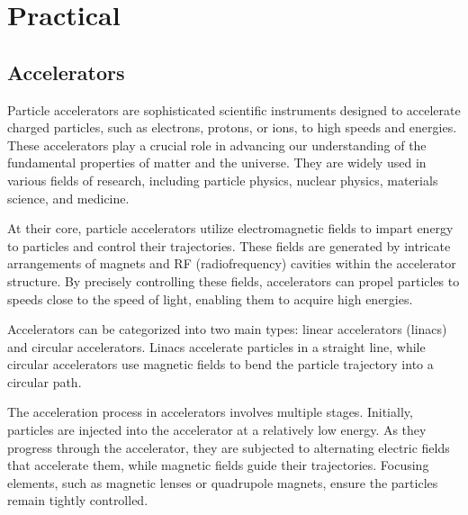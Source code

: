 \documentclass{article}
\begin{document}
\newcommand{\vecthreeBF}[1]{\vec{\textbf{#1}}}
\newcommand{\vecthree}[1]{\vec{#1}}

\newcommand{\parDeriv}[2]{\frac{\partial #1}{\partial #2}}
\newcommand{\parDerivS}[2]{\frac{\partial^2 #1}{\partial #2^2}}
\newcommand{\derivS}[2]{\frac{d^2 #1}{d#2^2}}

\newcommand{\dotProdBF}[2]{\vecthreeBF{#1} \cdot \vecthreeBF{#2}}
\newcommand{\dotProd}[2]{\vecthree{#1} \cdot \vecthree{#2}}

\newcommand{\crossProdBF}[2]{\vecthreeBF{#1} \times \vecthreeBF{#2}}
\newcommand{\crossProd}[2]{\vecthree{#1} \times \vecthree{#2}}


\newcommand{\fromeq}[1]{\textit{equation \ref{eq:#1}}}
\newcommand{\fromeqs}[2]{\textit{equations \ref{eq:#1} and \ref{eq:#2}}}


\section{Practical}

\subsection{Accelerators}
Particle accelerators are sophisticated scientific instruments designed to accelerate charged particles, such as electrons, protons, or ions, to high speeds and energies. 
These accelerators play a crucial role in advancing our understanding of the fundamental properties of matter and the universe. 
They are widely used in various fields of research, including particle physics, nuclear physics, materials science, and medicine.

At their core, particle accelerators utilize electromagnetic fields to impart energy to particles and control their trajectories. 
These fields are generated by intricate arrangements of magnets and RF (radiofrequency) cavities within the accelerator structure. 
By precisely controlling these fields, accelerators can propel particles to speeds close to the speed of light, enabling them to acquire high energies.

Accelerators can be categorized into two main types: linear accelerators (linacs) and circular accelerators. 
Linacs accelerate particles in a straight line, while circular accelerators use magnetic fields to bend the particle trajectory into a circular path. 

The acceleration process in accelerators involves multiple stages. Initially, particles are injected into the accelerator at a relatively low energy. 
As they progress through the accelerator, they are subjected to alternating electric fields that accelerate them, while magnetic fields guide their trajectories.
Focusing elements, such as magnetic lenses or quadrupole magnets, ensure the particles remain tightly controlled.
\end{document}
